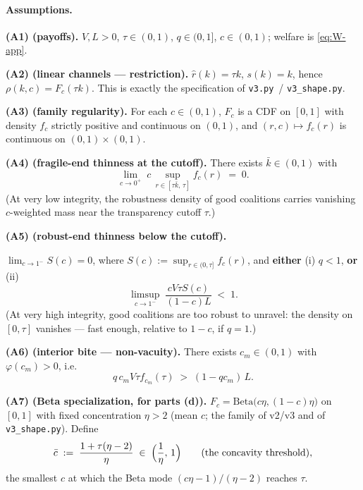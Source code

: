 \paragraph{Assumptions.}
\begin{assumptionlist}
\item[\textbf{(A1) (payoffs).}] $V, L > 0$, $\tau \in (0,1)$, $q \in (0,1]$,
  $c \in (0,1)$; welfare is \eqref{eq:W-app}.
\item[\textbf{(A2) (linear channels --- restriction).}] $\hat r(k) = \tau k$,
  $s(k) = k$, hence $\rho(k,c) = F_c(\tau k)$. This is exactly the specification of
  \texttt{v3.py}~/ \texttt{v3\_shape.py}.
\item[\textbf{(A3) (family regularity).}] For each $c \in (0,1)$, $F_c$ is a CDF on
  $[0,1]$ with density $f_c$ strictly positive and continuous on $(0,1)$, and
  $(r, c) \mapsto f_c(r)$ is continuous on $(0,1) \times (0,1)$.
\item[\textbf{(A4) (fragile-end thinness at the cutoff).}] There exists
  $\bar k \in (0,1)$ with
  \[
  \lim_{c \to 0^+} \; c \, \sup_{r \in [\tau\bar k,\, \tau]} f_c(r) \;=\; 0.
  \]
  (At very low integrity, the robustness density of good coalitions carries vanishing
  $c$-weighted mass near the transparency cutoff $\tau$.)
\item[\textbf{(A5) (robust-end thinness below the cutoff).}]
  {\sloppy
  $\lim_{c \to 1^-} S(c) = 0$, where $S(c) := \sup_{r \in (0,\tau]} f_c(r)$, and
  \textbf{either} (i) $q < 1$, \textbf{or} (ii)
  \[
  \limsup_{c \to 1^-} \; \frac{cV\tau S(c)}{(1 - c)L} \;<\; 1.
  \]
  (At very high integrity, good coalitions are too robust to unravel: the density on
  $[0, \tau]$ vanishes --- fast enough, relative to $1 - c$, if $q = 1$.)\par}
\item[\textbf{(A6) (interior bite --- non-vacuity).}] There exists $c_m \in (0,1)$ with
  $\varphi(c_m) > 0$, i.e.
  \[
  q\, c_m V \tau f_{c_m}(\tau) \;>\; (1 - q c_m)\, L.
  \]
\item[\textbf{(A7) (Beta specialization, for parts (d)).}]
  $F_c = \mathrm{Beta}\bigl(c\eta, (1-c)\eta\bigr)$ on $[0,1]$ with fixed concentration
  $\eta > 2$ (mean $c$; the family of v2/v3 and of \texttt{v3\_shape.py}). Define
  \[
  \bar c \;:=\; \frac{1 + \tau(\eta - 2)}{\eta} \;\in\; \Bigl(\frac{1}{\eta},\, 1\Bigr)
  \qquad \text{(the concavity threshold)},
  \]
  the smallest $c$ at which the Beta mode $(c\eta - 1)/(\eta - 2)$ reaches $\tau$.
\end{assumptionlist}

